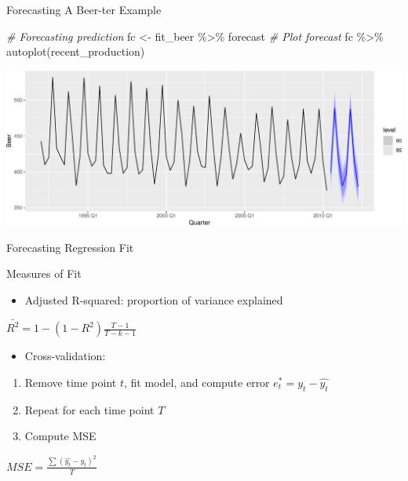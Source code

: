 \documentclass[
  ignorenonframetext,
]{beamer}
\newenvironment{Shaded}{\begin{snugshade}}{\end{snugshade}}
\newcommand{\CommentTok}[1]{\textcolor[rgb]{0.56,0.35,0.01}{\textit{#1}}}
\newcommand{\FunctionTok}[1]{\textcolor[rgb]{0.00,0.00,0.00}{#1}}
\newcommand{\NormalTok}[1]{#1}
\newcommand{\OtherTok}[1]{\textcolor[rgb]{0.56,0.35,0.01}{#1}}
\newcommand{\SpecialCharTok}[1]{\textcolor[rgb]{0.00,0.00,0.00}{#1}}
\providecommand{\tightlist}{%
  \setlength{\itemsep}{0pt}\setlength{\parskip}{0pt}}
\begin{document}
\begin{frame}[fragile]{Forecasting \textbar{} \small A Beer-ter Example}
\protect\hypertarget{forecasting-a-beer-ter-example-5}{}
\tiny

\begin{Shaded}
\begin{Highlighting}[]
\CommentTok{\# Forecasting prediction}
\NormalTok{fc }\OtherTok{\textless{}{-}}\NormalTok{ fit\_beer }\SpecialCharTok{\%\textgreater{}\%}\NormalTok{ forecast}
\CommentTok{\# Plot forecast}
\NormalTok{fc }\SpecialCharTok{\%\textgreater{}\%} \FunctionTok{autoplot}\NormalTok{(recent\_production)}
\end{Highlighting}
\end{Shaded}

\includegraphics{Time-series-regression-models_files/figure-beamer/unnamed-chunk-47-1.pdf}

\normalfont
\end{frame}

\begin{frame}{Forecasting \textbar{} \small Regression Fit}
\protect\hypertarget{forecasting-regression-fit}{}
\begin{block}{Measures of Fit}
\protect\hypertarget{measures-of-fit}{}
\begin{itemize}
\tightlist
\item
  Adjusted R-squared: proportion of variance explained \newline
\end{itemize}

\center \(\bar{R^2} = 1 - (1 - R^2) \frac{T - 1}{T - k - 1}\) \newline

\begin{itemize}
\tightlist
\item
  Cross-validation: \newline
\end{itemize}

\begin{enumerate}
\item
  Remove time point \(t\), fit model, and compute error
  \(e^*_t = y_t - \hat{y_t}\) \newline
\item
  Repeat for each time point \(T\) \newline
\item
  Compute MSE
\end{enumerate}

\center \(MSE = \frac{\sum (\hat{y_t} - y_t)^2}{T}\) \newline
\end{block}
\end{frame}
\end{document}
